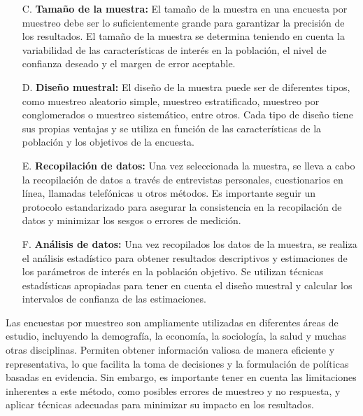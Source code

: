 \documentclass[8pt,a4paper]{beamer}
\begin{document}
{\begin{frame}{}
\begin{block}{}
\begin{enumerate}
\justifying
\item[C.] \textbf{Tamaño de la muestra:} El tamaño de la muestra en una encuesta por muestreo debe ser lo suficientemente grande para garantizar la precisión de los resultados. El tamaño de la muestra se determina teniendo en cuenta la variabilidad de las características de interés en la población, el nivel de confianza deseado y el margen de error aceptable.
\item[D.] \textbf{Diseño muestral:} El diseño de la muestra puede ser de diferentes tipos, como muestreo aleatorio simple, muestreo estratificado, muestreo por conglomerados o muestreo sistemático, entre otros. Cada tipo de diseño tiene sus propias ventajas y se utiliza en función de las características de la población y los objetivos de la encuesta.
\item[E.] \textbf{Recopilación de datos:} Una vez seleccionada la muestra, se lleva a cabo la recopilación de datos a través de entrevistas personales, cuestionarios en línea, llamadas telefónicas u otros métodos. Es importante seguir un protocolo estandarizado para asegurar la consistencia en la recopilación de datos y minimizar los sesgos o errores de medición.
\end{enumerate}
\end{block}
\end{frame}

\begin{frame}{}
\begin{block}{}
\justifying

\begin{enumerate}
\justifying
\item[F.] \textbf{Análisis de datos:} Una vez recopilados los datos de la muestra, se realiza el análisis estadístico para obtener resultados descriptivos y estimaciones de los parámetros de interés en la población objetivo. Se utilizan técnicas estadísticas apropiadas para tener en cuenta el diseño muestral y calcular los intervalos de confianza de las estimaciones.
\end{enumerate}
Las encuestas por muestreo son ampliamente utilizadas en diferentes áreas de estudio, incluyendo la demografía, la economía, la sociología, la salud y muchas otras disciplinas. Permiten obtener información valiosa de manera eficiente y representativa, lo que facilita la toma de decisiones y la formulación de políticas basadas en evidencia. Sin embargo, es importante tener en cuenta las limitaciones inherentes a este método, como posibles errores de muestreo y no respuesta, y aplicar técnicas adecuadas para minimizar su impacto en los resultados.
\end{block}
\end{frame}

}
\end{document}
